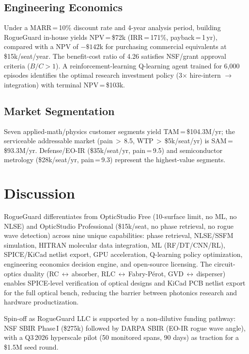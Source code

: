\documentclass[10pt,twocolumn]{article}
\begin{document}
\subsection{Engineering Economics}

Under a MARR\,=\,10\% discount rate and 4-year analysis period,
building RogueGuard in-house yields
NPV\,=\,\$72k (IRR\,=\,171\%, payback\,=\,1\,yr),
compared with a NPV of $-\$142$k for purchasing commercial equivalents at
\$15k/seat/year.
The benefit-cost ratio of 4.26 satisfies NSF/grant approval criteria
($B/C>1$).
A reinforcement-learning Q-learning agent trained for 6,000 episodes
identifies the optimal research investment policy (3$\times$ hire-intern
$\to$ integration) with terminal NPV\,=\,\$103k.

\subsection{Market Segmentation}

Seven applied-math/physics customer segments yield
TAM\,=\,\$104.3M/yr; the serviceable addressable market
(pain\,$>$\,8.5, WTP\,$>$\,\$5k/seat/yr) is SAM\,=\,\$93.3M/yr.
Defense/EO-IR (\$35k/seat/yr, pain\,=\,9.5) and semiconductor metrology
(\$28k/seat/yr, pain\,=\,9.3) represent the highest-value segments.

\section{Discussion}
\label{sec:discussion}

RogueGuard differentiates from OpticStudio Free (10-surface limit, no ML,
no NLSE) and OpticStudio Professional (\$15k/seat, no phase retrieval,
no rogue wave detection) across nine unique capabilities:
phase retrieval, NLSE/SSFM simulation, HITRAN molecular data integration,
ML (RF/DT/CNN/RL), SPICE/KiCad netlist export, GPU acceleration,
Q-learning policy optimization, engineering economics decision engine,
and open-source licensing.
The circuit-optics duality (RC\,$\leftrightarrow$\,absorber,
RLC\,$\leftrightarrow$\,Fabry-P\'{e}rot, GVD\,$\leftrightarrow$\,disperser)
enables SPICE-level verification of optical designs and KiCad PCB netlist
export for the full optical bench, reducing the barrier between photonics
research and hardware productization.

Spin-off as RogueGuard LLC is supported by a non-dilutive funding pathway:
NSF SBIR Phase\,I (\$275k) followed by DARPA SBIR (EO-IR rogue wave angle),
with a Q3\,2026 hyperscale pilot (50 monitored spans, 90 days) as traction
for a \$1.5M seed round.
\end{document}

